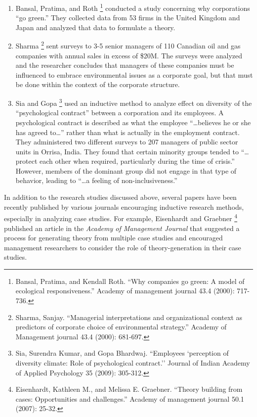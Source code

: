 \documentclass[]{book}
\let\rmarkdownfootnote\footnote%
\def\footnote{\protect\rmarkdownfootnote}
\theoremstyle{definition}
\theoremstyle{definition}
\theoremstyle{definition}
\theoremstyle{remark}
\begin{document}
\begin{enumerate}
\def\labelenumi{\arabic{enumi}.}
\item
  Bansal, Pratima, and Roth \footnote{Bansal, Pratima, and Kendall Roth.
    ``Why companies go green: A model of ecological responsiveness.''
    Academy of management journal 43.4 (2000): 717-736.} conducted a
  study concerning why corporations ``go green.'' They collected data
  from 53 firms in the United Kingdom and Japan and analyzed that data
  to formulate a theory.
\item
  Sharma \footnote{Sharma, Sanjay. ``Managerial interpretations and
    organizational context as predictors of corporate choice of
    environmental strategy.'' Academy of Management journal 43.4 (2000):
    681-697.} sent surveys to 3-5 senior managers of 110 Canadian oil
  and gas companies with annual sales in excess of \$20M. The surveys
  were analyzed and the researcher concludes that managers of these
  companies must be influenced to embrace environmental issues as a
  corporate goal, but that must be done within the context of the
  corporate structure.
\item
  Sia and Gopa \footnote{Sia, Surendra Kumar, and Gopa Bhardwaj.
    ``Employees `perception of diversity climate: Role of psychological
    contract.'' Journal of Indian Academy of Applied Psychology 35
    (2009): 305-312.} used an inductive method to analyze effect on
  diversity of the ``psychological contract'' between a corporation and
  its employees. A psychological contract is described as what the
  employee ``\ldots{}believes he or she has agreed to\ldots{}'' rather
  than what is actually in the employment contract. They administered
  two different surveys to 207 managers of public sector units in
  Orrisa, India. They found that certain minority groups tended to
  ``\ldots{}protect each other when required, particularly during the
  time of crisis.'' However, members of the dominant group did not
  engage in that type of behavior, leading to ``\ldots{}a feeling of
  non-inclusiveness.''
\end{enumerate}

In addition to the research studies discussed above, several papers have
been recently published by various journals encouraging inductive
research methods, especially in analyzing case studies. For example,
Eisenhardt and Graebner \footnote{Eisenhardt, Kathleen M., and Melissa
  E. Graebner. ``Theory building from cases: Opportunities and
  challenges.'' Academy of management journal 50.1 (2007): 25-32.}
published an article in the \emph{Academy of Management Journal} that
suggested a process for generating theory from multiple case studies and
encouraged management researchers to consider the role of
theory-generation in their case studies.
\end{document}
